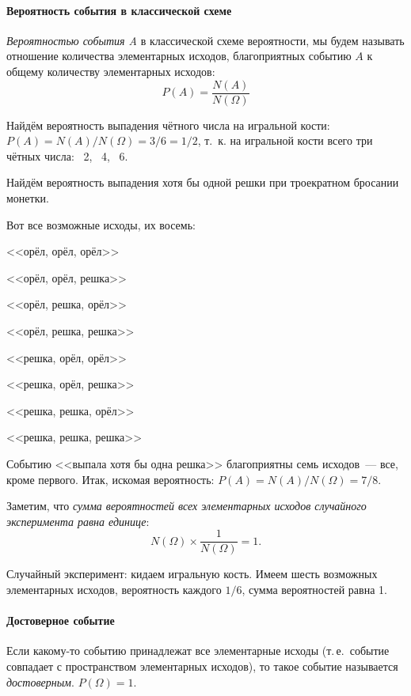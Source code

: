 \documentclass[11pt]{article}
\begin{document}
\paragraph{Вероятность события в классической схеме} \emph{Вероятностью события A} в классической схеме вероятности, мы будем называть отношение количества элементарных исходов, благоприятных событию $A$ к общему количеству элементарных исходов:
$$
	P(A)=\frac{N(A)}{N(\Omega)}
$$



\begin{examples}
	\item Найдём вероятность выпадения чётного числа на игральной кости: $P(A)=N(A)/N(\Omega)=3/6=1/2$, т.~к. на игральной кости всего три чётных числа: ~2, ~4, ~6.

	\item Найдём вероятность выпадения хотя бы одной решки при троекратном бросании монетки.

Вот все возможные исходы, их восемь:

   <<орёл, орёл, орёл>>

   <<орёл, орёл, решка>>

   <<орёл, решка, орёл>>

   <<орёл, решка, решка>>

   <<решка, орёл, орёл>>

   <<решка, орёл, решка>>

   <<решка, решка, орёл>>

   <<решка, решка, решка>>

Событию <<выпала хотя бы одна решка>> благоприятны семь исходов~--- все, кроме первого. Итак, искомая вероятность:
$P(A)=N(A)/N(\Omega)=7/8$.
\end{examples}

Заметим, что \emph{сумма вероятностей всех элементарных исходов случайного эксперимента равна единице}:
$$
	N(\Omega)\times\frac{1}{N(\Omega)}=1.
$$

\begin{examples}
Случайный эксперимент: кидаем игральную кость. Имеем шесть возможных элементарных исходов, вероятность каждого $1/6$, сумма вероятностей равна 1.
\end{examples}

\paragraph{Достоверное событие} Если какому-то событию принадлежат все элементарные исходы (т.\,е.~событие совпадает с пространством элементарных исходов), то такое событие называется \emph{достоверным}. $P(\Omega)=1$.
\end{document}
